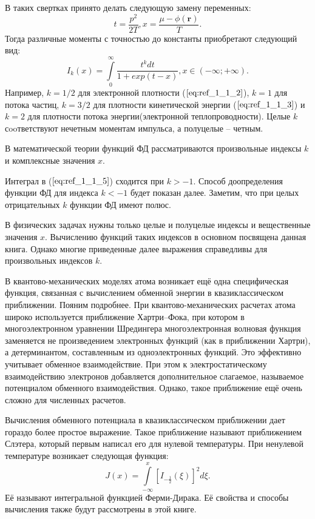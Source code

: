 В таких свертках принято делать следующую замену переменных:
\begin{equation}
t = \frac{p^2}{2T}, x = \frac{\mu - \phi(\textbf{r})}{T}.
\label{eq:ref_1_1_4}
\end{equation}
Тогда различные моменты с точностью до константы приобретают следующий вид:
\begin{equation}
I_k(x)=\int\limits_0^{\infty} \frac{t^kdt}{1+exp(t-x)}, x \in (-\infty ;+\infty).
\label{eq:ref_1_1_5}
\end{equation}
Например, $k = 1/2$ для электронной плотности ($\ref{eq:ref_1_1_2}$), $k = 1$ для потока частиц, $k = 3/2$ для плотности кинетической энергии ($\ref{eq:ref_1_1_3}$) и $k = 2$ для плотности потока энергии(электронной теплопроводности). Целые $k$ сooтветствуют нечетным моментам импульса, а полуцелые – четным.

В математической теории функций ФД рассматриваются произвольные индексы $k$ и комплексные значения $x$.

Интеграл в ($\ref{eq:ref_1_1_5}$) сходится при $k > -1$. Способ доопределения функции ФД для индекса $k < -1$ будет показан далее. Заметим, что при целых отрицательных $k$ функции ФД имеют полюс.

В физических задачах нужны только целые и полуцелые индексы и вещественные значения $x$. Вычислению функций таких индексов в основном посвящена данная книга. Однако многие приведенные далее выражения справедливы для произвольных индексов $k$.

В квантово-механических моделях атома возникает ещё одна специфическая функция, связанная
с вычислением обменной энергии в квазиклассическом приближении. Пояним подробнее.
При квантово-механических расчетах атома широко используется приближение Хартри–Фока, при котором в 
многоэлектронном уравнении Шредингера многоэлектронная волновая функция заменяется не произведением 
электронных функций (как в приближении Хартри), а детерминантом,
составленным из одноэлектронных функций. Это эффективно учитывает
обменное взаимодействие. При этом к электростатическому взаимодействию
электронов добавляется дополнительное слагаемое, называемое потенциалом
обменного взаимодействия. Однако, такое приближение ещё очень сложно для
численных расчетов.

Вычисления обменного потенциала в квазиклассическом приближении
дает гораздо более простое выражение. Такое приближение называют
приближением Слэтера, который первым написал его для нулевой
температуры. При ненулевой температуре возникает следующая функция:
\begin{equation}
J(x)=\int\limits_{-\infty}^x [I_{-\frac{1}{2}}(\xi)]^2d\xi.
\label{eq:ref_1_1_6}
\end{equation}
Её называют интегральной функцией Ферми-Дирака. Её свойства и способы вычисления также будут рассмотрены в этой книге. 
\\


